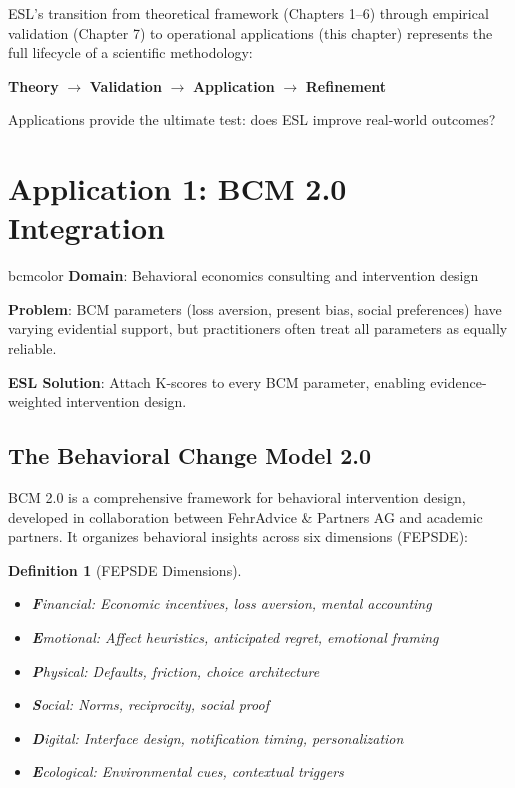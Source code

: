 \documentclass[11pt,a4paper]{article}
\newtheorem{definition}{Definition}[section]
\theoremstyle{remark}
\begin{document}
\begin{keyinsight}[title={From Framework to Operations}]
ESL's transition from theoretical framework (Chapters 1--6) through empirical validation (Chapter 7) to operational applications (this chapter) represents the full lifecycle of a scientific methodology:

\begin{center}
\textbf{Theory} $\to$ \textbf{Validation} $\to$ \textbf{Application} $\to$ \textbf{Refinement}
\end{center}

Applications provide the ultimate test: does ESL improve real-world outcomes?
\end{keyinsight}

\section{Application 1: BCM 2.0 Integration}
\label{sec:bcm}

\begin{applicationbox}{bcmcolor}
\textbf{Domain}: Behavioral economics consulting and intervention design

\textbf{Problem}: BCM parameters (loss aversion, present bias, social preferences) have varying evidential support, but practitioners often treat all parameters as equally reliable.

\textbf{ESL Solution}: Attach K-scores to every BCM parameter, enabling evidence-weighted intervention design.
\end{applicationbox}

\subsection{The Behavioral Change Model 2.0}

BCM 2.0 is a comprehensive framework for behavioral intervention design, developed in collaboration between FehrAdvice \& Partners AG and academic partners. It organizes behavioral insights across six dimensions (FEPSDE):

\begin{definition}[FEPSDE Dimensions]
\label{def:fepsde}
\begin{itemize}
    \item \textbf{F}inancial: Economic incentives, loss aversion, mental accounting
    \item \textbf{E}motional: Affect heuristics, anticipated regret, emotional framing
    \item \textbf{P}hysical: Defaults, friction, choice architecture
    \item \textbf{S}ocial: Norms, reciprocity, social proof
    \item \textbf{D}igital: Interface design, notification timing, personalization
    \item \textbf{E}cological: Environmental cues, contextual triggers
\end{itemize}
\end{definition}
\end{document}
